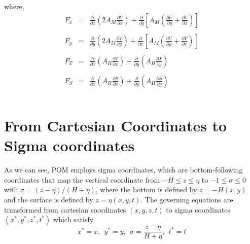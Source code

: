\documentclass[oribibl]{llncs}
\begin{document}
where,
\begin{eqnarray*}
F_x &=&  \frac{\partial}{\partial x} \left ( 2A_M \frac{\partial U}{\partial x} \right ) + \frac{\partial}{\partial y} \left [ A_M \left ( \frac{\partial U}{\partial y} + \frac{\partial V}{\partial x} \right ) \right ] \\  \\ 
F_y &=&  \frac{\partial}{\partial y} \left ( 2A_M \frac{\partial V}{\partial y} \right ) + \frac{\partial}{\partial x} \left [ A_M \left ( \frac{\partial U}{\partial y} + \frac{\partial V}{\partial x} \right ) \right ] \\ \nonumber \\ 
F_T &=&  \frac{\partial}{\partial x} \left ( A_H \frac{\partial T}{\partial x} \right ) + \frac{\partial}{\partial y} \left ( A_H \frac{\partial T}{\partial y} \right ) \\ \nonumber \\ 
F_S &=&  \frac{\partial}{\partial x} \left ( A_H \frac{\partial S}{\partial x} \right ) + \frac{\partial}{\partial y} \left ( A_H \frac{\partial S}{\partial y} \right ) \\ \nonumber \\ 
\end{eqnarray*}

\section{From Cartesian Coordinates to Sigma coordinates}
As we can see, POM employs sigma coordinates, which are bottom-following coordinates that map the vertical coordinate from $-H \leq z \leq \eta$ to $-1 \leq \sigma \leq 0$ with $\sigma  = (z-\eta)/(H + \eta)$, where the bottom is defined by $z =-H(x, y)$ and the surface is defined by $z = \eta(x, y, t)$. The governing equations are transformed from cartesian coordinates $(x,y,z,t)$ to sigma coordinates $(x^*,y^*,z^*,t^*)$ which satisfy
\begin{equation}
x^*=x,\ \ y^*=y,\ \ \sigma=\frac{z-\eta}{H+\eta},\ \ t^*=t
\end{equation}
\end{document}
